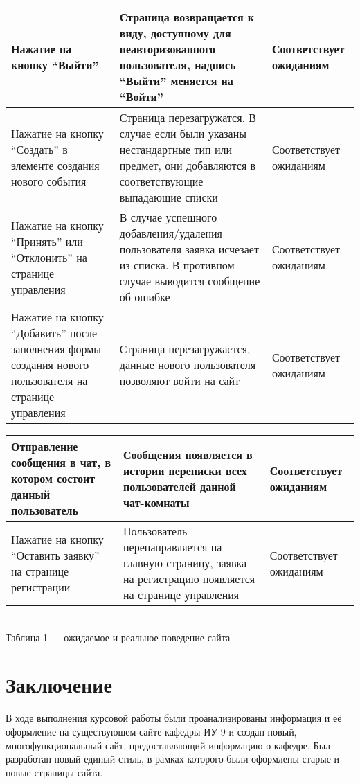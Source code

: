 \documentclass[14pt]{extarticle}
\begin{document}
\begin{center}
\begin{tabular}{| p{5cm} | p{5cm} | p{5cm} |}
Нажатие на кнопку \enquote{Выйти} &
Страница возвращается к виду, доступному для неавторизованного пользователя, надпись \enquote{Выйти} меняется на \enquote{Войти} &
Соответствует ожиданиям\\
\hline
Нажатие на кнопку \enquote{Создать} в элементе создания нового события &
Страница перезагружатся. В случае если были указаны нестандартные тип или предмет, они добавляются в соответствующие выпадающие списки &
Соответствует ожиданиям\\
\hline
Нажатие на кнопку \enquote{Принять} или \enquote{Отклонить} на странице управления &
В случае успешного добавления/удаления пользователя заявка исчезает из списка. В противном случае выводится сообщение об ошибке &
Соответствует ожиданиям\\
\hline
Нажатие на кнопку \enquote{Добавить} после заполнения формы создания нового пользователя на странице управления &
Страница перезагружается, данные нового пользователя позволяют войти на сайт &
Соответствует ожиданиям\\
\end{tabular}

\begin{tabular}{| p{5cm} | p{5cm} | p{5cm} |}
Отправление сообщения в чат, в котором состоит данный пользователь &
Сообщения появляется в истории переписки всех пользователей данной чат-комнаты &
Соответствует ожиданиям\\
\hline
Нажатие на кнопку \enquote{Оставить заявку} на странице регистрации &
Пользователь перенаправляется на главную страницу, заявка на регистрацию появляется на странице управления &
Соответствует ожиданиям\\
\hline  
\end{tabular}\\
\medskip
Таблица 1 --- ожидаемое и реальное поведение сайта
\end{center}

\newpage
\section*{Заключение}
В ходе выполнения курсовой работы были проанализированы информация и её оформление на существующем сайте кафедры ИУ-9 и создан новый, многофункциональный сайт, предоставляющий информацию о кафедре. Был разработан новый единый стиль, в рамках которого были оформлены старые и новые страницы сайта.
\end{document}
